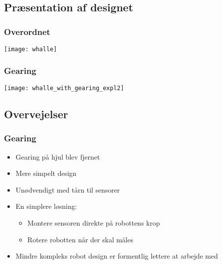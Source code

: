 \subsection{Præsentation af designet}
\begin{frame}
\frametitle{Overordnet}
\begin{center}
\texttt{[image: whalle]}
\end{center}
\end{frame}

\begin{frame}
\frametitle{Gearing}
\begin{center}
\texttt{[image: whalle\_with\_gearing\_expl2]}
\end{center}

\end{frame}

\subsection{Overvejelser}
\begin{frame}
\frametitle{Gearing}
\begin{itemize}
\item Gearing på hjul blev fjernet
\item Mere simpelt design
\item Unødvendigt med tårn til sensorer
\item En simplere løsning:
\begin{itemize}
\item Montere sensoren direkte på robottens krop
\item Rotere robotten når der skal måles
\end{itemize} 
\item Mindre kompleks robot design er formentlig lettere at arbejde med
\end{itemize}
\end{frame}



